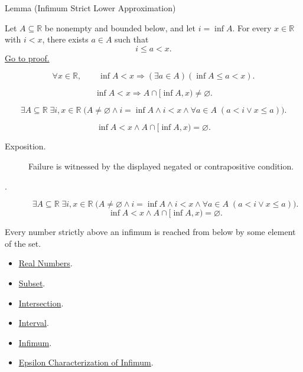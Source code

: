 \begin{lemmabox}{Lemma (Infimum Strict Lower Approximation)}
\begin{lemma}
\label{lem:infimum-strict-lower-approximation}
Let $A\subseteq\mathbb{R}$ be nonempty and bounded below, and let
$i=\inf A$.  For every $x\in\mathbb{R}$ with $i<x$, there exists
$a\in A$ such that
\[
i\le a<x.
\]
\hyperref[prf:infimum-strict-lower-approximation]{Go to proof.}
\end{lemma}
\end{lemmabox}
\begin{remark*}
\[
\forall x\in\mathbb{R},\qquad
\inf A<x
\Rightarrow
(\exists a\in A)(\inf A\leq a<x).
\]
\end{remark*}
\begin{remark*}
\[
\inf A<x\Rightarrow A\cap[\inf A,x)\ne\varnothing.
\]
\end{remark*}
\begin{remark*}
\[
\exists A\subseteq\mathbb{R}\;\exists i,x\in\mathbb{R}\;
\bigl(A\ne\varnothing\land i=\inf A\land i<x\land
\forall a\in A\;(a<i\lor x\le a)\bigr).
\]
\end{remark*}
\begin{remark*}
\[
\inf A<x\land A\cap[\inf A,x)=\varnothing.
\]
\end{remark*}

\begin{remark*}
\begin{description}
  \item[Exposition.]
  Failure is witnessed by the displayed negated or contrapositive condition.

  \item[\varnothing.]
  \[
\exists A\subseteq\mathbb{R}\;\exists i,x\in\mathbb{R}\;
\bigl(A\ne\varnothing\land i=\inf A\land i<x\land
\forall a\in A\;(a<i\lor x\le a)\bigr).
\]
\[
\inf A<x\land A\cap[\inf A,x)=\varnothing.
\]
\end{description}
\end{remark*}
\begin{remark*}[Interpretation]
Every number strictly above an infimum is reached from below by some element
of the set.
\end{remark*}
\begin{dependencies}
\begin{itemize}
\item \hyperref[def:reals]{Real Numbers}.
\item \hyperref[def:subset]{Subset}.
\item \hyperref[def:intersection]{Intersection}.
\item \hyperref[def:interval]{Interval}.
\item \hyperref[def:infimum]{Infimum}.
\item \hyperref[def:epsilon-characterization-of-infimum]{Epsilon Characterization of Infimum}.
\end{itemize}
\end{dependencies}
